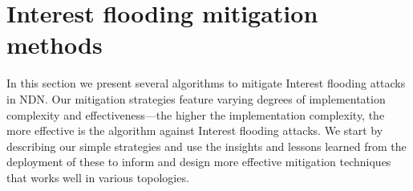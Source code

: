 \section{Interest flooding mitigation methods}
\label{sec:design}



In this section we present several algorithms to mitigate Interest flooding attacks in NDN.  Our mitigation strategies feature varying degrees of implementation complexity and effectiveness---the higher the implementation complexity, the more effective is the algorithm against Interest flooding attacks. We start by describing our simple strategies and use the insights and lessons learned from the deployment of these to inform and design more effective mitigation techniques that works well in various topologies.






